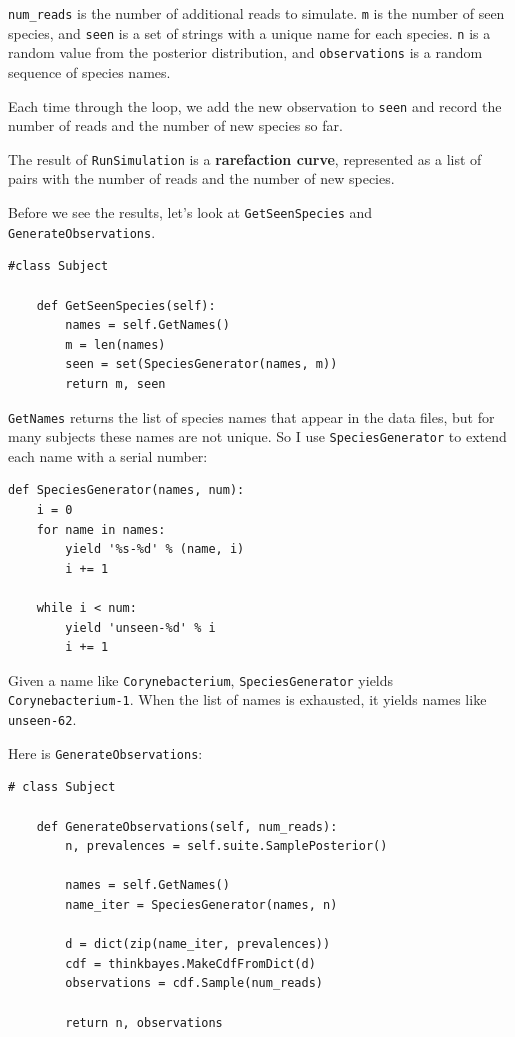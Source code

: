 \documentclass[12pt]{book}
\begin{document}
\verb"num_reads" is the number of additional reads to simulate.
{\tt m} is the number of seen species, and {\tt seen} is a set of
strings with a unique name for each species.
{\tt n} is a random value from the posterior distribution, and
{\tt observations} is a random sequence of species names.

Each time through the loop, we add the new observation to
{\tt seen} and record the number of reads and the number of
new species so far.

The result of {\tt RunSimulation} is a {\bf rarefaction curve},
represented as a list of pairs with the number of reads and
the number of new species.

Before we see the results, let's look at {\tt GetSeenSpecies} and
{\tt GenerateObservations}.

\begin{verbatim}
#class Subject

    def GetSeenSpecies(self):
        names = self.GetNames()
        m = len(names)
        seen = set(SpeciesGenerator(names, m))
        return m, seen
\end{verbatim}

{\tt GetNames} returns the list of species names that appear in
the data files, but for many subjects these names are not unique.
So I use {\tt SpeciesGenerator} to extend each name with a serial
number:

\begin{verbatim}
def SpeciesGenerator(names, num):
    i = 0
    for name in names:
        yield '%s-%d' % (name, i)
        i += 1

    while i < num:
        yield 'unseen-%d' % i
        i += 1
\end{verbatim}

Given a name like {\tt Corynebacterium}, {\tt SpeciesGenerator} yields
{\tt Corynebacterium-1}.  When the list of names is exhausted, it
yields names like {\tt unseen-62}.

Here is {\tt GenerateObservations}:

\begin{verbatim}
# class Subject

    def GenerateObservations(self, num_reads):
        n, prevalences = self.suite.SamplePosterior()

        names = self.GetNames()
        name_iter = SpeciesGenerator(names, n)

        d = dict(zip(name_iter, prevalences))
        cdf = thinkbayes.MakeCdfFromDict(d)
        observations = cdf.Sample(num_reads)

        return n, observations
\end{verbatim}
\end{document}
